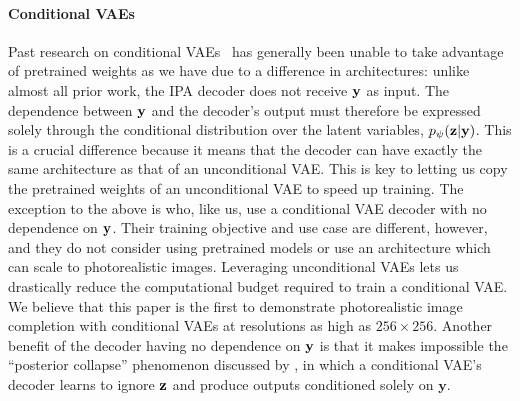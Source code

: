 \paragraph{Conditional VAEs}
Past research on conditional
VAEs~\citep{sohn2015learning,zheng2019pluralistic,ivanov2018variational,wan2021high}
has generally been unable to take advantage of pretrained weights as we have due
to a difference in architectures: unlike almost all prior work, the IPA decoder
does not receive ${\mathbf{y}}$ as input. The dependence between ${\mathbf{y}}$ and the
decoder's output must therefore be expressed solely through the conditional
distribution over the latent variables, $p_\psi({\mathbf{z}}|{\mathbf{y}})$. This is a crucial
difference because it means that the decoder can have exactly the same
architecture as that of an unconditional VAE. This is key to letting us copy the
pretrained weights of an unconditional VAE to speed up training. The exception
to the above is \citet{ma2018eddi} who, like us, use a conditional VAE decoder
with no dependence on ${\mathbf{y}}$. Their training objective and use case are
different, however, and they do not consider using pretrained models or use an
architecture which can scale to photorealistic images. Leveraging unconditional
VAEs lets us drastically reduce the computational budget required to train a
conditional VAE. We believe that this paper is the first to demonstrate
photorealistic image completion with conditional VAEs at resolutions as high as
$256\times256$.
% 
Another benefit of the decoder having no dependence on ${\mathbf{y}}$ is that it
makes impossible the ``posterior collapse'' phenomenon discussed by
\citet{zheng2019pluralistic}, in which a conditional VAE's decoder learns to
ignore ${\mathbf{z}}$ and produce outputs conditioned solely on $\mathbf{y}$.


